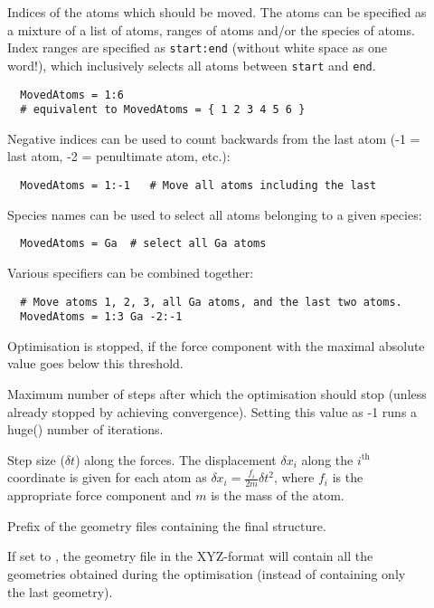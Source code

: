 \begin{description}
\item[] Indices of the atoms which should be moved. The
  atoms can be specified as a mixture of a list of atoms, ranges of
  atoms and/or the species of atoms. Index ranges are specified as
  \verb|start:end| (without white space as one word!), which
  inclusively selects all atoms between \verb|start| and \verb|end|.
\begin{verbatim}
  MovedAtoms = 1:6
  # equivalent to MovedAtoms = { 1 2 3 4 5 6 }
\end{verbatim}
  Negative indices can be used to count backwards from the last atom
  (-1 = last atom, -2 = penultimate atom, etc.):
\begin{verbatim}
  MovedAtoms = 1:-1   # Move all atoms including the last
\end{verbatim}
  Species names can be used to select all atoms belonging to a given
  species:
\begin{verbatim}
  MovedAtoms = Ga  # select all Ga atoms
\end{verbatim}
  Various specifiers can be combined together:
\begin{verbatim}
  # Move atoms 1, 2, 3, all Ga atoms, and the last two atoms.
  MovedAtoms = 1:3 Ga -2:-1
\end{verbatim}

\item[] Optimisation is
  stopped, if the force component with the maximal absolute value goes
  below this threshold.

\item[] Maximum number of steps after which the optimisation should
  stop (unless already stopped by achieving convergence). Setting this value as
  -1 runs a huge() number of iterations.

\item[] Step size ($\delta t$)
  along the forces. The displacement $\delta x_i$ along the
  $i^\mathrm{th}$ coordinate is given for each atom as $\delta x_i =
  \frac{f_i}{2m}\delta t^2$, where $f_i$ is the appropriate force
  component and $m$ is the mass of the atom.

\item[] Prefix of the geometry files containing the
  final structure.

\item[] If set to , the geometry file in
  the XYZ-format will contain all the geometries obtained during the
  optimisation (instead of containing only the last geometry).


\end{description}
